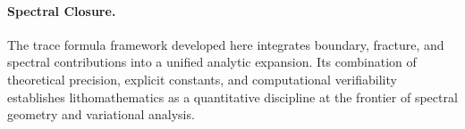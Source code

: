 
\paragraph{Spectral Closure.}
The trace formula framework developed here integrates boundary,
fracture, and spectral contributions into a unified analytic expansion.
Its combination of theoretical precision, explicit constants, and
computational verifiability establishes lithomathematics as a
quantitative discipline at the frontier of spectral geometry and
variational analysis.

